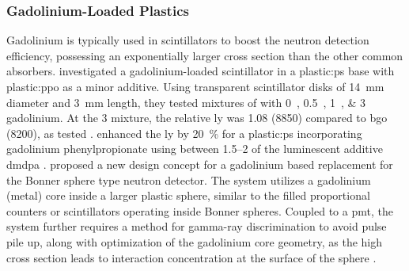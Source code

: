 \documentclass[../../../../main.tex]{subfiles}%
\begin{document}
%
    \subsubsection{Gadolinium{\--}Loaded Plastics}%
    \label{sec:chapter-2:scintillator-detectors:plastics:gadolinium-loaded}%
    Gadolinium is typically used in scintillators to boost the neutron detection efficiency, possessing an exponentially larger cross section than the other common absorbers.
    \citeauthor*{Ovechkina_2009} investigated a gadolinium-loaded scintillator in a \gls{plastic:ps} base with \gls{plastic:ppo} as a minor additive.
    Using transparent scintillator disks of \SI{14}{\milli\meter} diameter and \SI{3}{\milli\meter} length, they tested mixtures of with \SIlist{0;0.5;1;3}{\percentweight} gadolinium.
    At the \SI{3}{\percentweight} mixture, the relative \gls{ly} was \num{1.08} (\SI{8850}{\lightyield}) compared to \gls{bgo} (\SI{8200}{\lightyield}), as tested \cite{Ovechkina_2009}.
    \citeauthor*{Bedrik_2011} enhanced the \gls{ly} by \SI{20}{\percent} for a \gls{plastic:ps} incorporating gadolinium phenylpropionate using between \SIrange{1.5}{2}{\percentweight} of the luminescent additive \gls{dmdpa} \cite{Bedrik_2011}.
    \citeauthor*{Dumazert_2016} proposed a new design concept for a gadolinium based replacement for the Bonner sphere type neutron detector.
    The system utilizes a gadolinium (metal) core inside a larger plastic sphere, similar to the  filled proportional counters or  scintillators operating inside Bonner spheres.    
    Coupled to a \gls{pmt}, the system further requires a method for \gls{gamma-ray} discrimination to avoid pulse pile up, along with optimization of the gadolinium core geometry, as the high cross section leads to interaction concentration at the surface of the sphere \cite{Dumazert_2016}.
\end{document}
